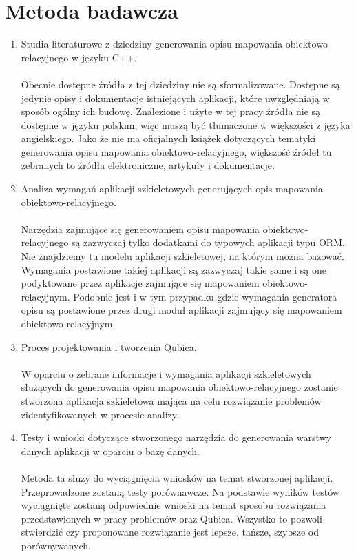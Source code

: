 \documentclass[12pt]{report}
\begin{document}
\section{Metoda badawcza}
\begin{enumerate}
\item Studia literaturowe z dziedziny generowania opisu mapowania obiektowo-relacyjnego w języku C++. \\ \\
Obecnie dostępne źródła z tej dziedziny nie są sformalizowane. Dostępne są jedynie opisy i dokumentacje istniejących aplikacji, które uwzględniają
w sposób ogólny ich budowę. Znalezione i użyte w tej pracy źródła nie są dostępne w języku polskim, więc muszą być tłumaczone w większości z języka angielskiego.
Jako że nie ma oficjalnych książek dotyczących tematyki generowania opisu mapowania obiektowo-relacyjnego, większość źródeł tu zebranych to źródła elektroniczne, artykuły i dokumentacje.
\item Analiza wymagań aplikacji szkieletowych generujących opis mapowania obiektowo-relacyjnego. \\ \\
Narzędzia zajmujące się generowaniem opisu mapowania obiektowo-relacyjnego są zazwyczaj tylko dodatkami do typowych aplikacji typu ORM. Nie znajdziemy tu
modelu aplikacji szkieletowej, na którym można bazować. Wymagania postawione takiej aplikacji są zazwyczaj takie same i są one podyktowane przez aplikacje zajmujące się mapowaniem obiektowo-relacyjnym. Podobnie jest i w tym przypadku gdzie wymagania generatora opisu są postawione przez drugi moduł aplikacji zajmujący się mapowaniem obiektowo-relacyjnym.
\item Proces projektowania i tworzenia Qubica. \\ \\
W oparciu o zebrane informacje i wymagania aplikacji szkieletowych służących do generowania opisu mapowania obiektowo-relacyjnego zostanie stworzona aplikacja szkieletowa mająca na celu rozwiązanie problemów zidentyfikowanych w procesie analizy.
\item Testy i wnioski dotyczące stworzonego narzędzia do generowania warstwy danych aplikacji w oparciu o bazę danych. \\ \\
Metoda ta służy do wyciągnięcia wniosków na temat stworzonej aplikacji. Przeprowadzone zostaną testy porównawcze. Na podstawie wyników testów wyciągnięte zostaną odpowiednie wnioski na temat sposobu rozwiązania przedstawionych w pracy problemów oraz Qubica. Wszystko to pozwoli stwierdzić czy proponowane rozwiązanie jest lepsze, tańsze, szybsze od porównywanych.

\end{enumerate}
\end{document}
